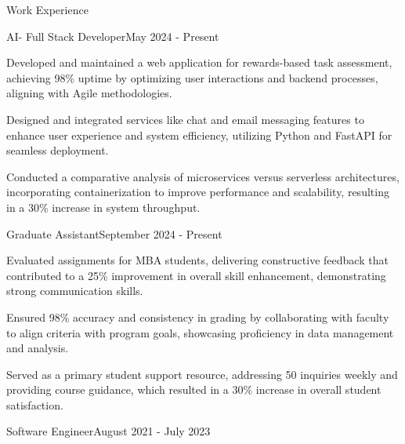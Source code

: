 \documentclass{resume} %
\begin{document}
    \begin{rSection}{Work Experience}
                    \begin{rSubsection}
                {AI{-} Full Stack Developer}{May 2024 - Present}
                                    {}
                                {}
                                    \item Developed and maintained a web application for rewards{-}based task assessment, achieving 98\% uptime by optimizing user interactions and backend processes, aligning with Agile methodologies.
                                    \item Designed and integrated services like chat and email messaging features to enhance user experience and system efficiency, utilizing Python and FastAPI for seamless deployment.
                                    \item Conducted a comparative analysis of microservices versus serverless architectures, incorporating containerization to improve performance and scalability, resulting in a 30\% increase in system throughput.
                            \end{rSubsection}
                    \begin{rSubsection}
                {Graduate Assistant}{September 2024 - Present}
                                    {}
                                {}
                                    \item Evaluated assignments for MBA students, delivering constructive feedback that contributed to a 25\% improvement in overall skill enhancement, demonstrating strong communication skills.
                                    \item Ensured 98\% accuracy and consistency in grading by collaborating with faculty to align criteria with program goals, showcasing proficiency in data management and analysis.
                                    \item Served as a primary student support resource, addressing 50 inquiries weekly and providing course guidance, which resulted in a 30\% increase in overall student satisfaction.
                            \end{rSubsection}
                    \begin{rSubsection}
                {Software Engineer}{August 2021 - July 2023}

\end{rSubsection}
\end{rSection}
\end{document}
